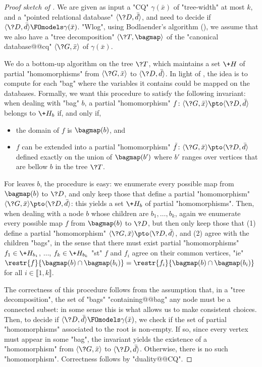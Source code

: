 \begin{proof}[Proof sketch of {}]
	We are given as input a "CQ" $\gamma(\bar x)$ of "tree-width" at most $k$,
	and a "pointed relational database" $\tup{\?D,\bar d}$, and need
	to decide if $\tup{\?D, \bar d} \FOmodels \gamma(\bar x)$.
	"Wlog", using Bodlaender's algorithm (),
	we assume that we also have a "tree decomposition" $\tup{\?T,\bagmap}$
	of the "canonical database@@cq" $\tup{\?G, \bar x}$ of $\gamma(\bar x)$.

	We do a bottom-up algorithm on the tree $\?T$,
	which maintains a set $\+H$ of partial "homomorphisms" from
	$\tup{\?G, \bar x}$ to $\tup{\?D, \bar d}$.
	In light of , the idea is to compute
	for each "bag" where the variables it contains could be mapped
	on the databases.
	Formally, we want this procedure
	to satisfy the following invariant:
	when dealing with "bag" $b$, a partial "homomorphism"
	$f\colon \tup{\?G, \bar x} \pto \tup{\?D, \bar d}$ belongs to $\+H_b$ if, and only if,
	\begin{itemize}
		\item the domain of $f$ is $\bagmap(b)$, and
		\item $f$ can be extended into a partial "homomorphism"
			$\tilde f\colon \tup{\?G, \bar x} \pto \tup{\?D, \bar d}$
			defined exactly on the union of $\bagmap(b')$ where $b'$ ranges
			over vertices that are bellow $b$ in the tree $\?T$.
	\end{itemize}
	For leaves $b$, the procedure is easy: we enumerate every possible map
	from $\bagmap(b)$ to $\?D$, and only keep those that define a 
	partial "homomorphism" $\tup{\?G, \bar x} \pto \tup{\?D, \bar d}$: this
	yields a set $\+H_b$ of partial "homomorphisms".
	Then, when dealing with a node $b$ whose children are $b_1,\hdots,b_k$,
	again we enumerate every possible map $f$
	from $\bagmap(b)$ to $\?D$, but then only keep those that
	(1) define a partial "homomorphism" $\tup{\?G, \bar x} \pto \tup{\?D, \bar d}$,
	and (2) agree with the children "bags", in the sense that there must exist
	partial "homomorphisms" $f_1 \in \+H_{b_1}$, $\dotsc$, $f_k \in \+H_{b_k}$
	"st" $f$ and $f_i$ agree on their common vertices,
	"ie" $\restr{f}{\bagmap(b)\cap \bagmap(b_i)} = \restr{f_i}{\bagmap(b)\cap \bagmap(b_i)}$
	for all $i \in \lBrack 1,k\rBrack$.
	
	The correctness of this procedure follows from the assumption that,
	in a "tree decomposition", the set of "bags" "containing@@bag" any node
	must be a connected subset: in some sense this is what allows us to make
	consistent choices.
	Then, to decide if $\tup{\?D, \bar d} \FOmodels \gamma(\bar x)$,
	we check if the set of partial "homomorphisms" associated to the root
	is non-empty. If so, since every vertex must appear in some "bag",
	the invariant yields the existence of a "homomorphism" 
	from $\tup{\?G, \bar x}$ to $\tup{\?D, \bar d}$.
	Otherwise, there is no such "homomorphism". Correctness follows by "duality@@CQ".


\end{proof}
